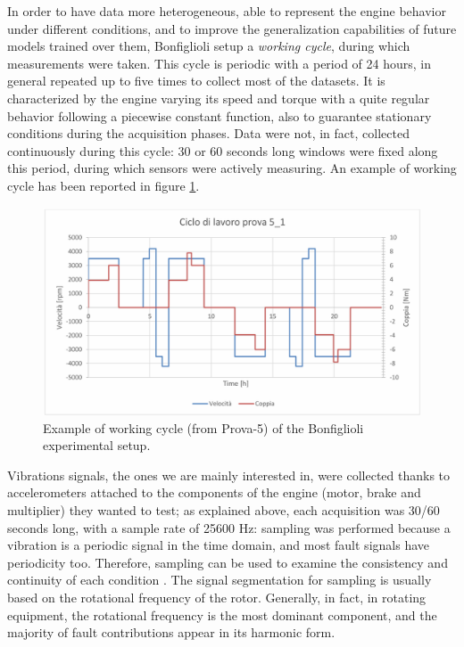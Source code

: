 \documentclass[../main.tex]{subfiles}
\begin{document}
In order to have data more heterogeneous, able to represent the engine behavior under different conditions, and to improve the generalization capabilities of future models trained over them, Bonfiglioli setup a \textit{working cycle}, during which measurements were taken. This cycle is periodic with a period of 24 hours, in general repeated up to five times to collect most of the datasets. It is characterized by the engine varying its speed and torque with a quite regular behavior following a piecewise constant function, also to guarantee stationary conditions during the acquisition phases. Data were not, in fact, collected continuously during this cycle: 30 or 60 seconds long windows were fixed along this period, during which sensors were actively measuring. An example of working cycle has been reported in figure \ref{fig:bonfiglioli_example_working_cycle}.
\begin{figure}[ht]
	\centering
	\includegraphics[width=\textwidth]{pictures/bonfiglioli_example_working_cycle}
	\caption{Example of working cycle (from Prova-5) of the Bonfiglioli experimental setup.}
	\label{fig:bonfiglioli_example_working_cycle}
\end{figure}
Vibrations signals, the ones we are mainly interested in, were collected thanks to accelerometers attached to the components of the engine (motor, brake and multiplier) they wanted to test; as explained above, each acquisition was 30/60 seconds long, with a sample rate of 25600 Hz: sampling was performed because a vibration is a periodic signal in the time domain, and most fault signals have periodicity too. Therefore, sampling can be used to examine the consistency and continuity of each condition \cite{deep_learning_vibration_gravity}. The signal segmentation for sampling is usually based on the rotational frequency of the rotor. Generally, in fact, in rotating equipment, the rotational frequency is the most dominant component, and the majority of fault contributions appear in its harmonic form.
\end{document}
